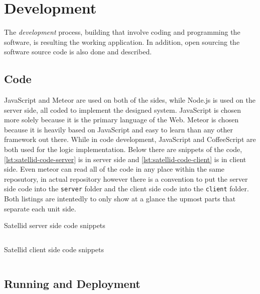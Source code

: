 \section{Development}
\label{sec:development}

The \textit{development} process, building that involve coding and programming the software, is resulting the working application.
In addition, open sourcing the software source code is also done and described.

\subsection{Code}

JavaScript and Meteor are used on both of the sides, while Node.js is used on the server side, all coded to implement the designed system.
JavaScript is chosen more solely because it is the primary language of the Web.
Meteor is chosen because it is heavily based on JavaScript and easy to learn than any other framework out there.
While in code development, JavaScript and CoffeeScript are both used for the logic implementation.
Below there are snippets of the code, \autoref{lst:satellid-code-server} is in server side and \autoref{lst:satellid-code-client} is in client side.
Even meteor can read all of the code in any place within the same reposutory, in actual repository however there is a convention to put the server side code into the \verb|server| folder and the client side code into the \verb|client| folder.
Both listings are intentedly to only show at a glance the upmost parts that separate each unit side.

\begin{listing}[htbp]
  \caption{Satellid server side code snippets}
  \inputminted{javascript}{\dir/include/code/satellid-server.js}
  \label{lst:satellid-code-server}
\end{listing}

\begin{listing}[htbp]
  \caption{Satellid client side code snippets}
  \inputminted{javascript}{\dir/include/code/satellid-client.js}
  \label{lst:satellid-code-client}
\end{listing}

\subsection{Running and Deployment}

